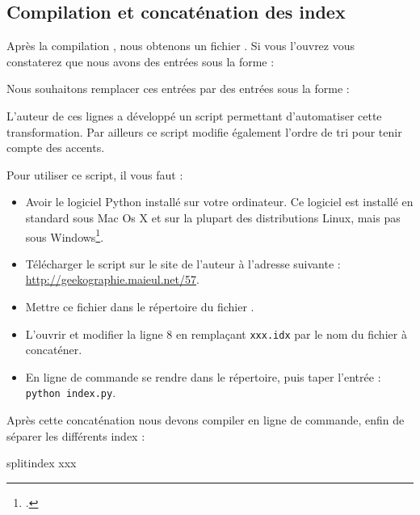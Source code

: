 \subsection{Compilation et concaténation des index}


Après la  compilation \XeLaTeX, nous obtenons un fichier . Si vous l'ouvrez vous constaterez que nous avons des entrées sous la forme : 

\begin{latexcode}
\end{latexcode}

Nous souhaitons remplacer ces entrées par des entrées sous la forme :

\begin{latexcode}
\end{latexcode}

L'auteur de ces lignes a développé un script permettant d'automatiser cette transformation. Par ailleurs ce script modifie également l'ordre de tri pour tenir compte des accents.

Pour utiliser ce script, il vous faut :\label{python}
\begin{itemize}
\item Avoir le logiciel Python installé sur votre ordinateur. Ce logiciel est installé en standard sous Mac Os X et sur la plupart des distributions Linux, mais pas sous Windows\footcite{python_windows}.
\item Télécharger le script sur le site de l'auteur à l'adresse suivante : \url{http://geekographie.maieul.net/57}.
\item Mettre ce fichier dans le répertoire du fichier . 
\item L'ouvrir et modifier la ligne 8 en remplaçant \verb|xxx.idx| par le nom du fichier à concaténer.
\item En ligne de commande se rendre dans le  répertoire, puis taper l'entrée : \verb|python index.py|.
\end{itemize}


Après cette concaténation nous devons compiler en ligne de commande, enfin de séparer les différents index :

\begin{bashcode}
splitindex xxx
\end{bashcode}


